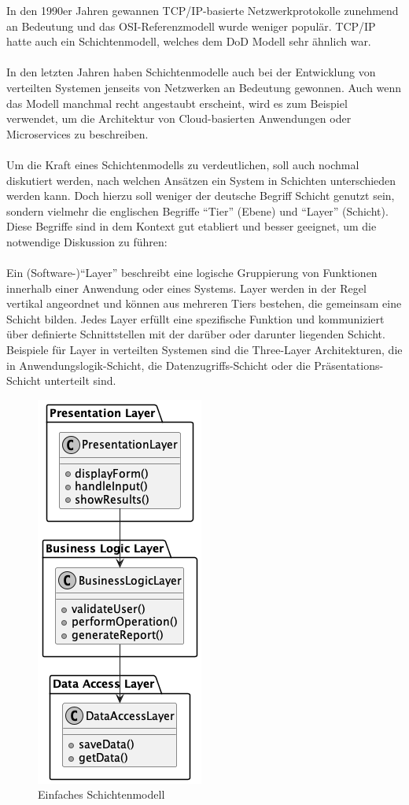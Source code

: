 In den 1990er Jahren gewannen TCP/IP-basierte Netzwerkprotokolle zunehmend an Bedeutung und das OSI-Referenzmodell wurde weniger populär. TCP/IP hatte auch ein Schichtenmodell, welches dem DoD Modell sehr ähnlich war. 
\\\\
In den letzten Jahren haben Schichtenmodelle auch bei der Entwicklung von verteilten Systemen jenseits von Netzwerken an Bedeutung gewonnen. Auch wenn das Modell manchmal recht angestaubt erscheint, wird es zum Beispiel verwendet, um die Architektur von Cloud-basierten Anwendungen oder Microservices zu beschreiben.
\\\\
Um die Kraft eines Schichtenmodells zu verdeutlichen, soll auch nochmal diskutiert werden, nach welchen Ansätzen ein System in Schichten unterschieden werden kann. Doch hierzu soll weniger der deutsche Begriff Schicht genutzt sein, sondern vielmehr  die englischen Begriffe \enquote{Tier} (Ebene) und \enquote{Layer} (Schicht). Diese Begriffe sind in dem Kontext gut etabliert und besser geeignet, um die notwendige Diskussion zu führen:
\\\\
Ein (Software-)\enquote{Layer} beschreibt eine logische Gruppierung von Funktionen innerhalb einer Anwendung oder eines Systems. Layer werden in der Regel vertikal angeordnet und können aus mehreren Tiers bestehen, die gemeinsam eine Schicht bilden. Jedes Layer erfüllt eine spezifische Funktion und  kommuniziert über definierte Schnittstellen mit der darüber oder darunter liegenden Schicht. Beispiele für Layer in verteilten Systemen sind die Three-Layer Architekturen, die in Anwendungslogik-Schicht, die Datenzugriffs-Schicht oder die Präsentations-Schicht unterteilt sind.
\begin{figure}[!h]
  \centering
  \includegraphics[width=0.25 \textwidth]{fig/uml/simple-layers.png}
  \caption{Einfaches Schichtenmodell}
  \label{fig:simple-layer}
\end{figure}

